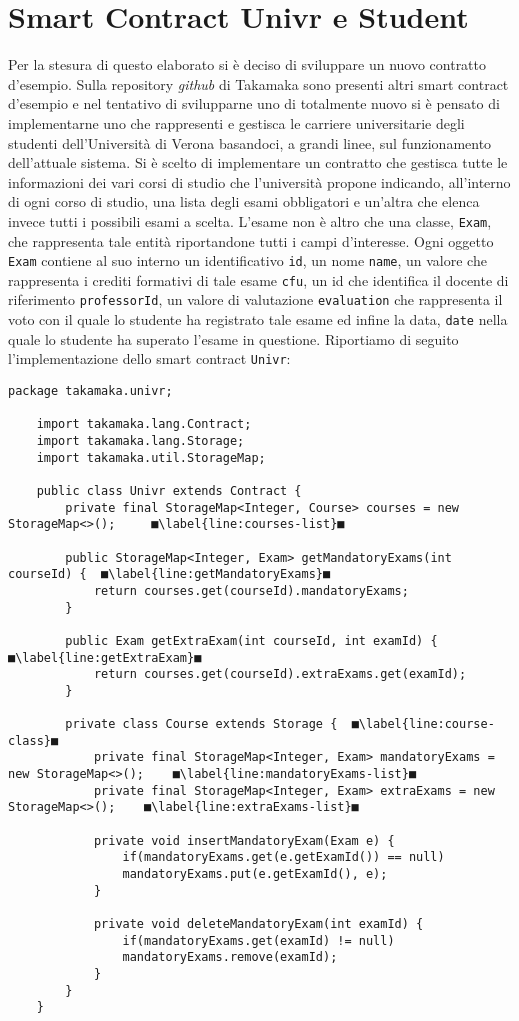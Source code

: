 \section{Smart Contract Univr e Student}
Per la stesura di questo elaborato si è deciso di sviluppare un nuovo contratto d'esempio. Sulla repository \textit{github} di Takamaka sono presenti altri smart contract d'esempio e nel tentativo di svilupparne uno di totalmente nuovo si è pensato di implementarne uno che rappresenti e gestisca le carriere universitarie degli studenti dell'Università di Verona basandoci, a grandi linee, sul funzionamento dell'attuale sistema. Si è scelto di implementare un contratto che gestisca tutte le informazioni dei vari corsi di studio che l'università propone indicando, all'interno di ogni corso di studio, una lista degli esami obbligatori e un'altra che elenca invece tutti i possibili esami a scelta. L'esame non è altro che una classe, \lstinline|Exam|, che rappresenta tale entità riportandone tutti i campi d'interesse. Ogni oggetto \lstinline|Exam| contiene al suo interno un identificativo \lstinline|id|, un nome \lstinline|name|, un valore che rappresenta i crediti formativi di tale esame \lstinline|cfu|, un id che identifica il docente di riferimento \lstinline|professorId|, un valore di valutazione \lstinline|evaluation| che rappresenta il voto con il quale lo studente ha registrato tale esame ed infine la data, \lstinline|date| nella quale lo studente ha superato l'esame in questione. Riportiamo di seguito l'implementazione dello smart contract \lstinline|Univr|:
%
\begin{lstlisting}[breaklines=true]
	package takamaka.univr;
	
	import takamaka.lang.Contract;
	import takamaka.lang.Storage;
	import takamaka.util.StorageMap;
	
	public class Univr extends Contract {
		private final StorageMap<Integer, Course> courses = new StorageMap<>();		■\label{line:courses-list}■
		
		public StorageMap<Integer, Exam> getMandatoryExams(int courseId) {	■\label{line:getMandatoryExams}■
			return courses.get(courseId).mandatoryExams;
		}
		
		public Exam getExtraExam(int courseId, int examId) {	■\label{line:getExtraExam}■ 
			return courses.get(courseId).extraExams.get(examId);
		}
		
		private class Course extends Storage {	■\label{line:course-class}■
			private final StorageMap<Integer, Exam> mandatoryExams = new StorageMap<>();	■\label{line:mandatoryExams-list}■
			private final StorageMap<Integer, Exam> extraExams = new StorageMap<>();	■\label{line:extraExams-list}■
			
			private void insertMandatoryExam(Exam e) {
				if(mandatoryExams.get(e.getExamId()) == null)
				mandatoryExams.put(e.getExamId(), e);
			}
			
			private void deleteMandatoryExam(int examId) {
				if(mandatoryExams.get(examId) != null)
				mandatoryExams.remove(examId);
			}
		}
	}
\end{lstlisting}
